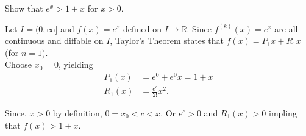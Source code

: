 \documentclass[boxes, qed]{homework}
\begin{document}
\begin{problem}Show that $e^x>1+x$ for $x>0$.
\end{problem}
\begin{solution}Let $I=(0,\infty]$ and $f(x)=e^x$ defined on $I\to{\mathbb{R}}$.
  Since $f^{(k)}(x)=e^x$ are all continuous and diffable on $I$, Taylor's Theorem
  states that $f(x)=P_1{x}+R_1{x}$ (for $n=1$).\\

  Choose $x_0=0$, yielding
  \begin{align*}
    P_1(x)&=e^0+e^0x=1+x\\
    R_1(x)&=\frac{e^c}{2!}x^2.
  \end{align*}

  Since, $x>0$ by definition, $0=x_0<c<x$. Or
  $e^c>0$ and $R_1(x)>0$
  impling that $f(x)>1+x$.
\end{solution}
\end{document}
